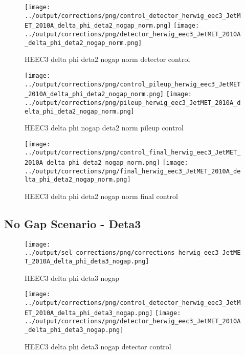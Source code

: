 \documentclass[11pt]{book}
\begin{document}
\begin{figure}[ht]
\centering
\texttt{[image: ../output/corrections/png/control\_detector\_herwig\_eec3\_JetMET\_2010A\_delta\_phi\_deta2\_nogap\_norm.png]}
\texttt{[image: ../output/corrections/png/detector\_herwig\_eec3\_JetMET\_2010A\_delta\_phi\_deta2\_nogap\_norm.png]}
\caption{HEEC3 delta phi deta2 nogap norm detector control}
\label{fig:HEEC3_JetMET_2010A_delta_phi_deta2_nogap_norm_detector_control}
\end{figure}

\begin{figure}[ht]
\centering
\texttt{[image: ../output/corrections/png/control\_pileup\_herwig\_eec3\_JetMET\_2010A\_delta\_phi\_deta2\_nogap\_norm.png]}
\texttt{[image: ../output/corrections/png/pileup\_herwig\_eec3\_JetMET\_2010A\_delta\_phi\_deta2\_nogap\_norm.png]}
\caption{HEEC3 delta phi nogap deta2 norm pileup control}
\label{fig:HEEC3_JetMET_2010A_delta_phi_deta2_nogap_norm_pileup_control}
\end{figure}


\begin{figure}[ht]
\centering
\texttt{[image: ../output/corrections/png/control\_final\_herwig\_eec3\_JetMET\_2010A\_delta\_phi\_deta2\_nogap\_norm.png]}
\texttt{[image: ../output/corrections/png/final\_herwig\_eec3\_JetMET\_2010A\_delta\_phi\_deta2\_nogap\_norm.png]}
\caption{HEEC3 delta phi deta2 nogap norm final control}
\label{fig:HEEC3_JetMET_2010A_delta_phi_deta2_nogap_norm_final_control}
\end{figure}


\clearpage
\subsection{No Gap Scenario - Deta3}
\begin{figure}[ht]
\centering
\texttt{[image: ../output/sel\_corrections/png/corrections\_herwig\_eec3\_JetMET\_2010A\_delta\_phi\_deta3\_nogap.png]}
\caption{HEEC3 delta phi deta3 nogap}
\label{fig:HEEC3_JetMET_2010A_delta_phi_deta3_nogap}
\end{figure}

\begin{figure}[ht]
\centering
\texttt{[image: ../output/corrections/png/control\_detector\_herwig\_eec3\_JetMET\_2010A\_delta\_phi\_deta3\_nogap.png]}
\texttt{[image: ../output/corrections/png/detector\_herwig\_eec3\_JetMET\_2010A\_delta\_phi\_deta3\_nogap.png]}
\caption{HEEC3 delta phi deta3 nogap detector control}
\label{fig:HEEC3_JetMET_2010A_delta_phi_deta3_nogap_detector_control}
\end{figure}
\end{document}
